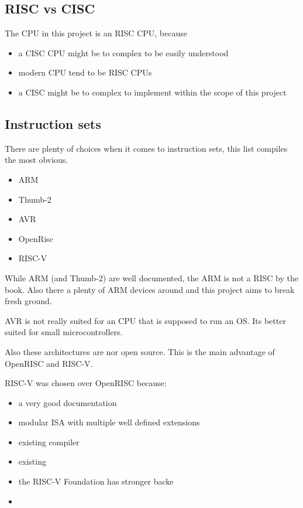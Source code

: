 

\subsection{RISC vs CISC}

The CPU in this project is an RISC CPU, because
\begin{itemize}
	\item a CISC CPU might be to complex to be easily understood
	\item modern CPU tend to be RISC CPUs
	\item a CISC might be to complex to implement within the scope of this project 
\end{itemize}

\subsection{Instruction sets}
There are plenty of choices when it comes to instruction sets, 
this list compiles the most obvious.

\begin{itemize}
	\item  ARM
	\item Thumb-2
	\item AVR
	\item OpenRisc
	\item RISC-V
\end{itemize}

While ARM (and Thumb-2) are well documented, the ARM is not a RISC by the book.
Also there a plenty of ARM devices around and this project aims to break fresh ground.

AVR is not really suited for an CPU that is supposed to run an OS. 
Its better suited for small microcontrollers.

Also these architectures are nor open source.
This is the main advantage of OpenRISC and RISC-V.

RISC-V was chosen over OpenRISC because:

\begin{itemize}
	\item a very good documentation
	\item modular ISA with multiple well defined extensions
	\item existing compiler
	\item existing 
	\item the RISC-V Foundation has stronger backe
	\item
\end{itemize}

 